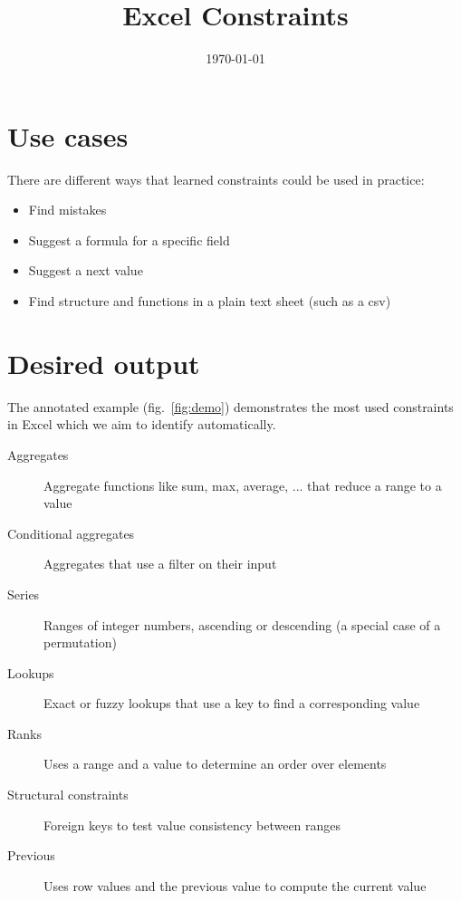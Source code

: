 \documentclass[a4paper]{article}
\title{Excel Constraints}
\date{\today}
\begin{document}
\maketitle


\section{Use cases} %
\label{sec:use_cases}
There are different ways that learned constraints could be used in practice:

\begin{itemize}
	\item Find mistakes
	\item Suggest a formula for a specific field
	\item Suggest a next value
	\item Find structure and functions in a plain text sheet (such as a csv)
\end{itemize}


\section{Desired output} %
\label{sec:demo_example}
The annotated example (fig.~\ref{fig:demo}) demonstrates the most used constraints in Excel which we aim to identify automatically.

\begin{description}
	\item[Aggregates] Aggregate functions like sum, max, average, ... that reduce a range to a value
	\item[Conditional aggregates] Aggregates that use a filter on their input
	\item[Series] Ranges of integer numbers, ascending or descending (a special case of a permutation)
	\item[Lookups] Exact or fuzzy lookups that use a key to find a corresponding value
	\item[Ranks] Uses a range and a value to determine an order over elements
	\item[Structural constraints] Foreign keys to test value consistency between ranges
	\item[Previous] Uses row values and the previous value to compute the current value
\end{description}
\end{document}

